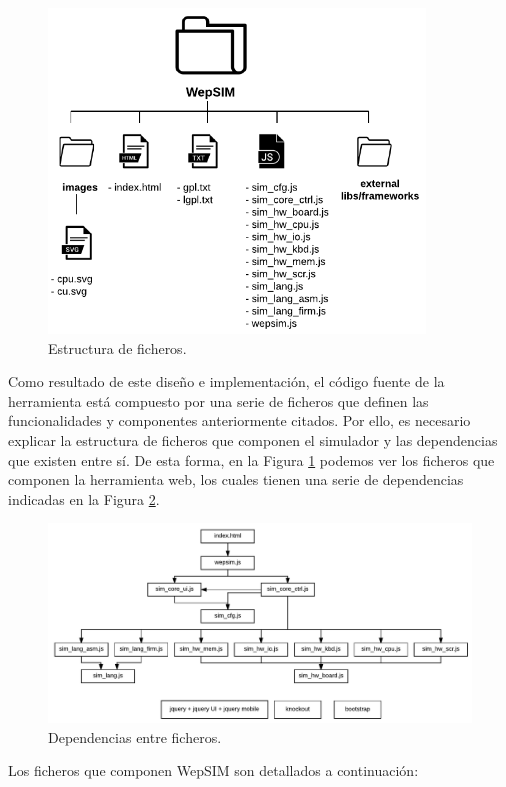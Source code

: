 \begin{figure}[htbp]
 	\centering
 	\includegraphics[width=10cm]{figures/folder_diagram}
 	\caption{Estructura de ficheros.}
	\label{fig:folder_structure}
\end{figure}

Como resultado de este diseño e implementación, el código fuente de la herramienta está compuesto por una serie de ficheros que definen las funcionalidades y componentes anteriormente citados. Por ello, es necesario explicar la estructura de ficheros que componen el simulador y las dependencias que existen entre sí. De esta forma, en la Figura \ref{fig:folder_structure} podemos ver los ficheros que componen la herramienta web, los cuales tienen una serie de dependencias indicadas en la Figura \ref{fig:files_dependencies}.

\begin{figure}[htbp]
 	\centering
 	\includegraphics[width=15.5cm]{figures/dependencies_diagram}
 	\caption{Dependencias entre ficheros.}
	\label{fig:files_dependencies}
\end{figure}

Los ficheros que componen WepSIM son detallados a continuación:

